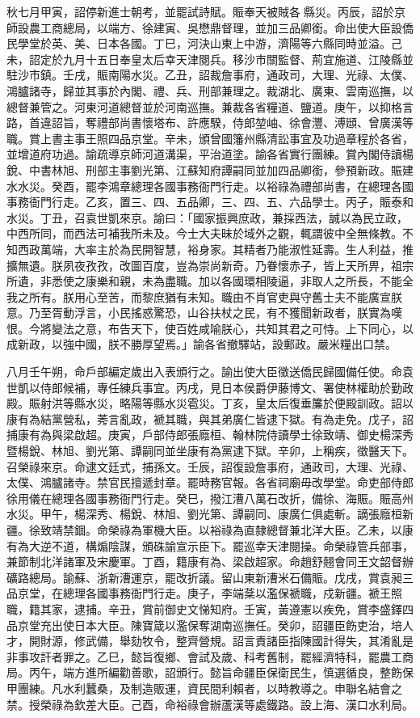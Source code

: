 \begin{pinyinscope}
秋七月甲寅，詔停新進士朝考，並罷試詩賦。賑奉天被賊各縣災。丙辰，詔於京師設農工商總局，以端方、徐建寅、吳懋鼎督理，並加三品卿銜。命出使大臣設僑民學堂於英、美、日本各國。丁巳，河決山東上中游，濟陽等六縣同時並溢。己未，詔定於九月十五日奉皇太后幸天津閱兵。移沙市關監督、荊宜施道、江陵縣並駐沙市鎮。壬戌，賑南陽水災。乙丑，詔裁詹事府，通政司，大理、光祿、太僕、鴻臚諸寺，歸並其事於內閣、禮、兵、刑部兼理之。裁湖北、廣東、雲南巡撫，以總督兼管之。河東河道總督並於河南巡撫。兼裁各省糧道、鹽道。庚午，以抑格言路，首違詔旨，奪禮部尚書懷塔布、許應騤，侍郎堃岫、徐會灃、溥頲、曾廣漢等職。賞上書主事王照四品京堂。辛未，頒曾國籓州縣清訟事宜及功過章程於各省，並增道府功過。諭疏導京師河道溝渠，平治道塗。諭各省實行團練。賞內閣侍讀楊銳、中書林旭、刑部主事劉光第、江蘇知府譚嗣同並加四品卿銜，參預新政。賑建水水災。癸酉，罷李鴻章總理各國事務衙門行走。以裕祿為禮部尚書，在總理各國事務衙門行走。乙亥，置三、四、五品卿，三、四、五、六品學士。丙子，賑泰和水災。丁丑，召袁世凱來京。諭曰：「國家振興庶政，兼採西法，誠以為民立政，中西所同，而西法可補我所未及。今士大夫昧於域外之觀，輒謂彼中全無條教。不知西政萬端，大率主於為民開智慧，裕身家。其精者乃能淑性延壽。生人利益，推擴無遺。朕夙夜孜孜，改圖百度，豈為崇尚新奇。乃眷懷赤子，皆上天所畀，祖宗所遺，非悉使之康樂和親，未為盡職。加以各國環相陵逼，非取人之所長，不能全我之所有。朕用心至苦，而黎庶猶有未知。職由不肖官吏與守舊士夫不能廣宣朕意。乃至胥動浮言，小民搖惑驚恐，山谷扶杖之民，有不獲聞新政者，朕實為嘆恨。今將變法之意，布告天下，使百姓咸喻朕心，共知其君之可恃。上下同心，以成新政，以強中國，朕不勝厚望焉。」諭各省撤驛站，設郵政。嚴米糧出口禁。

八月壬午朔，命戶部編定歲出入表頒行之。諭出使大臣徵送僑民歸國備任使。命袁世凱以侍郎候補，專任練兵事宜。丙戌，見日本侯爵伊藤博文、署使林權助於勤政殿。賑射洪等縣水災，略陽等縣水災雹災。丁亥，皇太后復垂簾於便殿訓政。詔以康有為結黨營私，莠言亂政，褫其職，與其弟廣仁皆逮下獄。有為走免。戊子，詔捕康有為與梁啟超。庚寅，戶部侍郎張廕桓、翰林院侍讀學士徐致靖、御史楊深秀暨楊銳、林旭、劉光第、譚嗣同並坐康有為黨逮下獄。辛卯，上稱疾，徵醫天下。召榮祿來京。命逮文廷式，捕孫文。壬辰，詔復設詹事府，通政司，大理、光祿、太僕、鴻臚諸寺。禁官民擅遞封章。罷時務官報。各省祠廟毋改學堂。命吏部侍郎徐用儀在總理各國事務衙門行走。癸巳，撥江漕八萬石改折，備徐、海賑。賑高州水災。甲午，楊深秀、楊銳、林旭、劉光第、譚嗣同、康廣仁俱處斬。謫張廕桓新疆。徐致靖禁錮。命榮祿為軍機大臣。以裕祿為直隸總督兼北洋大臣。乙未，以康有為大逆不道，構煽陰謀，頒硃諭宣示臣下。罷巡幸天津閱操。命榮祿管兵部事，兼節制北洋諸軍及宋慶軍。丁酉，籍康有為、梁啟超家。命趙舒翹會同王文韶督辦礦路總局。諭蘇、浙新漕運京，罷改折議。留山東新漕米石備賑。戊戌，賞袁昶三品京堂，在總理各國事務衙門行走。庚子，李端棻以濫保褫職，戍新疆。褫王照職，籍其家，逮捕。辛丑，賞前御史文悌知府。壬寅，黃遵憲以疾免，賞李盛鐸四品京堂充出使日本大臣。陳寶箴以濫保奪湖南巡撫任。癸卯，詔疆臣飭吏治，培人才，開財源，修武備，舉劾牧令，整齊營規。詔言責諸臣指陳國計得失，其淆亂是非事攻訐者罪之。乙巳，懿旨復鄉、會試及歲、科考舊制，罷經濟特科，罷農工商局。丙午，端方進所編勸善歌，詔頒行。懿旨命疆臣保衛民生，慎選循良，整飭保甲團練。凡水利蠶桑，及制造販運，資民間利賴者，以時教導之。申聯名結會之禁。授榮祿為欽差大臣。己酉，命裕祿會辦蘆漢等處鐵路。設上海、漢口水利局。


\end{pinyinscope}
